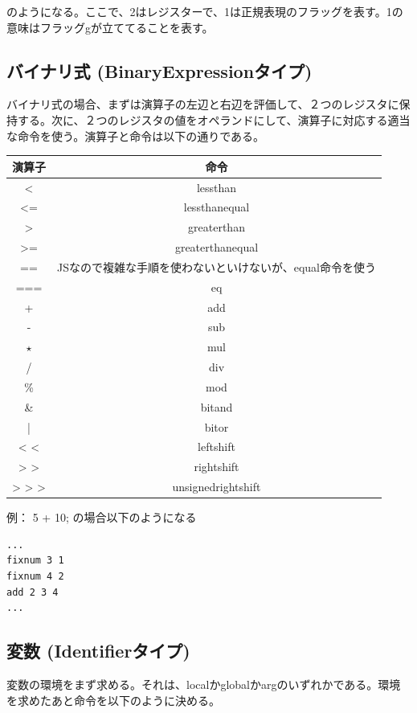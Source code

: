 \documentclass[12pt]{article}
\begin{document}
のようになる。ここで、2はレジスターで、1は正規表現のフラッグを表す。1の意味はフラッグgが立ててることを表す。

\subsection{バイナリ式 (BinaryExpressionタイプ)}
バイナリ式の場合、まずは演算子の左辺と右辺を評価して、２つのレジスタに保持する。次に、２つのレジスタの値をオペランドにして、演算子に対応する適当な命令を使う。演算子と命令は以下の通りである。

\begin{table}[h]
\centering
\begin{tabular}{|c|c|}
	\hline
	演算子 & 命令 \\
	\hline
	< & lessthan \\
	<= & lessthanequal \\
	> & greaterthan \\
	>= & greaterthanequal \\
	== & JSなので複雑な手順を使わないといけないが、equal命令を使う \\
	=== & eq \\
	+ & add \\
	- & sub \\
	$\star$ & mul \\
	/ & div \\
	\% & mod \\
	\& & bitand \\
	| & bitor \\
	< < & leftshift \\
	> > & rightshift \\
	> > > & unsignedrightshift \\
	\hline
\end{tabular}
\end{table}
\FloatBarrier

例： 5 + 10; の場合以下のようになる\\

\begin{lstlisting}
...
fixnum 3 1
fixnum 4 2
add 2 3 4
...
\end{lstlisting}
\FloatBarrier

\subsection{変数 (Identifierタイプ)}
変数の環境をまず求める。それは、localかglobalかargのいずれかである。環境を求めたあと命令を以下のように決める。
\end{document}
